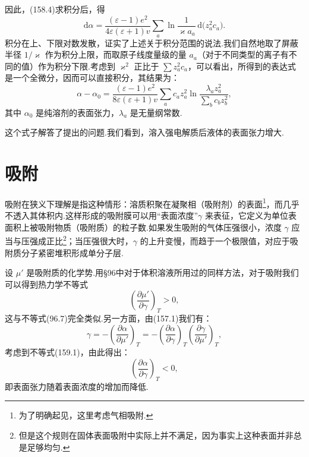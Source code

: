 因此，(158.4)求积分后，得
\begin{equation*}
  \mathrm{d}\alpha=\frac{(\varepsilon-1)e^2}{4\varepsilon(\varepsilon+1)v}
  \sum_a\ln\frac{1}{\varkappa a_a}\,\mathrm{d}\bigl(z_a^2c_a\bigr).
\end{equation*}
积分在上、下限对数发散，证实了上述关于积分范围的说法.我们自然地取了屏蔽半径 $1/\varkappa$ 作为积分上限，而取原子线度量级的量 $a_a$（对于不同类型的离子有不同的值）作为积分下限.考虑到 $\varkappa^2$ 正比于 $\sum z_a^2c_a$，可以看出，所得到的表达式是一个全微分，因而可以直接积分，其结果为：
\begin{equation}
  \alpha-\alpha_0=\frac{(\varepsilon-1)e^2}{8\varepsilon(\varepsilon+1)v}
  \sum_a c_a z_a^2\ln\frac{\lambda_a z_a^2}{\sum_b c_b z_b^2},
\end{equation}
其中 $\alpha_0$ 是纯溶剂的表面张力，$\lambda_a$ 是无量纲常数.

这个式子解答了提出的问题.我们看到，溶入强电解质后液体的表面张力增大.

\section{吸附}

吸附在狭义下理解是指这种情形：溶质积聚在凝聚相（吸附剂）的表面\footnote{为了明确起见，这里考虑气相吸附.}，而几乎不透入其体积内.这样形成的吸附膜可以用“表面浓度”$\gamma$ 来表征，它定义为单位表面积上被吸附物质（吸附质）的粒子数.如果发生吸附的气体压强很小，浓度 $\gamma$ 应当与压强成正比\footnote{但是这个规则在固体表面吸附中实际上并不满足，因为事实上这种表面并非总是足够均匀.}；当压强很大时，$\gamma$ 的上升变慢，而趋于一个极限值，对应于吸附质分子紧密堆积形成单分子层.

设 $\mu'$ 是吸附质的化学势.用§96中对于体积溶液所用过的同样方法，对于吸附我们可以得到热力学不等式
\begin{equation}
  \left(\frac{\partial\mu'}{\partial\gamma}\right)_T>0,
\end{equation}
这与不等式(96.7)完全类似.另一方面，由(157.1)我们有：
\begin{equation}
  \gamma=-\left(\frac{\partial\alpha}{\partial\mu'}\right)_T
  =-\left(\frac{\partial\alpha}{\partial\gamma}\right)_T
  \left(\frac{\partial\gamma}{\partial\mu'}\right)_T,
\end{equation}
考虑到不等式(159.1)，由此得出：
\begin{equation}
  \left(\frac{\partial\alpha}{\partial\gamma}\right)_T<0,
\end{equation}
即表面张力随着表面浓度的增加而降低.

